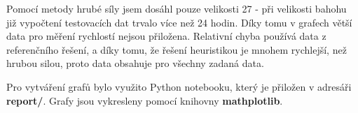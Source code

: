\documentclass[a4paper,10pt,twocolumn]{article}
\begin{document}
Pomocí metody hrubé síly jsem dosáhl pouze velikosti 27 - při velikosti bahohu již vypočtení testovacích dat trvalo více než 24 hodin. Díky tomu v grafech větší data pro měření rychlostí nejsou přiložena. 
Relativní chyba používá data z referenčního řešení, a díky tomu, že řešení heuristikou je mnohem rychlejší, než hrubou silou, proto data obsahuje pro všechny zadaná data.

Pro vytváření grafů bylo využito Python notebooku, který je přiložen v adresáři \textbf{report/}. Grafy jsou vykresleny pomocí knihovny \textbf{mathplotlib}.








\end{document}
